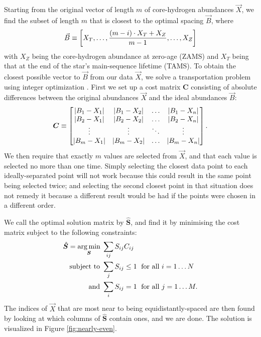 \documentclass[manuscript]{aastex}
\begin{document}
Starting from the original vector of length $m$ of core-hydrogen abundances $\vec X$, we find the subset of length $m$ that is closest to the optimal spacing $\vec B$, where
\begin{equation}
  \vec B \equiv \qty[
    X_T, 
    \ldots,
    \frac{(m-i)\cdot X_T + X_Z}{m-1}, 
    \ldots, 
    X_Z
  ]
\end{equation}
with $X_Z$ being the core-hydrogen abundance at zero-age (ZAMS) and $X_T$ being that at the end of the star's main-sequence lifetime (TAMS). To obtain the closest possible vector to $\vec B$ from our data $\vec X$, we solve a transportation problem using integer optimization \citep{23145595}. First we set up a cost matrix $\boldsymbol{C}$ consisting of absolute differences between the original abundances $\vec X$ and the ideal abundances $\vec B$:
\begin{equation}
  \boldsymbol C \equiv 
  \begin{bmatrix}
    \abs{B_1-X_1} & \abs{B_1-X_2} & \dots & \abs{B_1-X_n} \\ 
    \abs{B_2-X_1} & \abs{B_2-X_2} & \dots & \abs{B_2-X_n} \\ 
    \vdots & \vdots & \ddots & \vdots\\ 
    \abs{B_m-X_1} & \abs{B_m-X_2} & \dots & \abs{B_m-X_n}
  \end{bmatrix}.
\end{equation}
We then require that exactly $m$ values are selected from $\vec X$, and that each value is selected no more than one time. Simply selecting the closest data point to each ideally-separated point will not work because this could result in the same point being selected twice; and selecting the second closest point in that situation does not remedy it because a different result would be had if the points were chosen in a different order. 

We call the optimal solution matrix by $\hat{\boldsymbol{S}}$, and find it by minimising the cost matrix subject to the following constraints:
\begin{align}
  \hat{\boldsymbol{S}} = \underset{\boldsymbol S}{\arg\min} \; & \sum_{ij} S_{ij} C_{ij} \notag\\
  \text{subject to } & \sum_j S_{ij} \leq 1 \; \text{ for all } i=1\ldots N \notag\\
  \text{and } & \sum_i S_{ij} = 1 \; \text{ for all } j=1\ldots M.
  \label{eq:optimal-spacing}
\end{align}
The indices of $\vec X$ that are most near to being equidistantly-spaced are then found by looking at which columns of $\hat{\boldsymbol S}$ contain ones, and we are done. The solution is visualized in Figure \ref{fig:nearly-even}.
\end{document}
